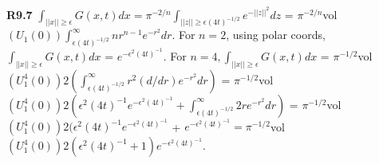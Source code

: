 {\bf R9.7} $\int_{||x|| \geq \epsilon} G(x,t) dx = \pi^{-2/n} \int_{||z||\geq \epsilon (4t)^{-1/2}}e^{-||z||^2}dz$ = $\pi^{-2/n} $vol$(U_1(0))\int_{ \epsilon (4t)^{-1/2} }^{\infty} n r^{n-1} e^{-r^2} dr$. For $n = 2$, using polar coords, $\int_{||x|| \geq \epsilon} G(x,t) dx$ = $e^{-\epsilon^2(4t)^{-1}}$.  For $n = 4, \int_{||x|| \geq \epsilon} G(x,t) dx$ = $\pi^{-1/2}$vol$(U_1^4(0)) 2 ( \int_{ \epsilon (4t)^{-1/2} }^{\infty} r^2 (d/dr) e^{-r^2} dr)$ = $\pi^{-1/2}$vol$(U_1^4(0)) 2 ( \epsilon^2 (4t)^{-1} e^{-\epsilon^2 (4t)^{-1}} + \int_{ \epsilon (4t)^{-1/2} }^{\infty}2 r  e^{-r^2} dr)$ = $\pi^{-1/2}$vol$(U_1^4(0)) 2 (\epsilon^2 (4t)^{-1} e^{-\epsilon^2 (4t)^{-1}}$ + $e^{-\epsilon^2 (4t)^{-1}} = \pi^{-1/2} $vol$(U_1^4 (0)) 2 (\epsilon^2 (4t)^{-1} + 1) e^{-\epsilon^2 (4t)^{-1}}$.
